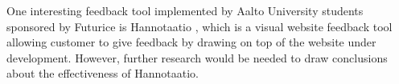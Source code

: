 \documentclass[conference]{IEEEtran}
\begin{document}
One interesting feedback tool implemented by Aalto University students sponsored by Futurice is Hannotaatio \cite{hannotaatio}, which is a visual website feedback tool allowing customer to give feedback by drawing on top of the website under development. However, further research would be needed to draw conclusions about the effectiveness of Hannotaatio.

%
%


%


\end{document}
